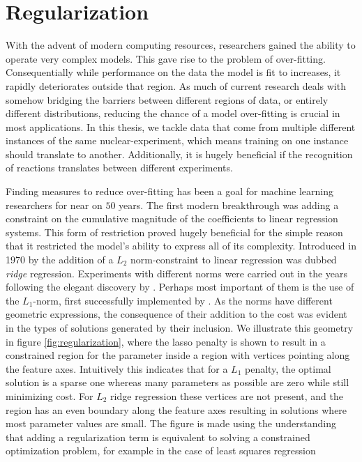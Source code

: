 \section{Regularization}\label{sec:regularization}

With the advent of modern computing resources, researchers gained the ability to operate very complex models. This gave rise to the problem of over-fitting. Consequentially while performance on the data the model is fit to increases, it rapidly deteriorates outside that region. As much of current research deals with somehow bridging the barriers between different regions of data, or entirely different distributions, reducing the chance of a model over-fitting is crucial in most applications. In this thesis, we tackle data that come from multiple different instances of the same nuclear-experiment, which means training on one instance should translate to another. Additionally, it is hugely beneficial if the recognition of reactions translates between different experiments.   

Finding measures to reduce over-fitting has been a goal for machine learning researchers for near on $50$ years. The first modern breakthrough was adding a constraint on the cumulative magnitude of the coefficients to linear regression systems. This form of restriction proved hugely beneficial for the simple reason that it restricted the model's ability to express all of its complexity. Introduced in 1970 by \citet{Hoerl1970} the addition of a $L_2$ norm-constraint to linear regression was dubbed \textit{ridge} regression. Experiments with different norms were carried out in the years following the elegant discovery by \cite{Hoerl1970}. Perhaps most important of them is the use of the $L_1$-norm, first successfully implemented by \citet{Tibshirani1996}. As the norms have different geometric expressions, the consequence of their addition to the cost was evident in the types of solutions generated by their inclusion. We illustrate this geometry in figure \ref{fig:regularization}, where the lasso penalty is shown to result in a constrained region for the parameter inside a region with vertices pointing along the feature axes. Intuitively this indicates that for a $L_1$ penalty, the optimal solution is a sparse one whereas many parameters as possible are zero while still minimizing cost. For $L_2$ ridge regression these vertices are not present, and the region has an even boundary along the feature axes resulting in solutions where most parameter values are small. The figure is made using the understanding that adding a regularization term is equivalent to solving a constrained optimization problem, for example in the case of least squares regression 


